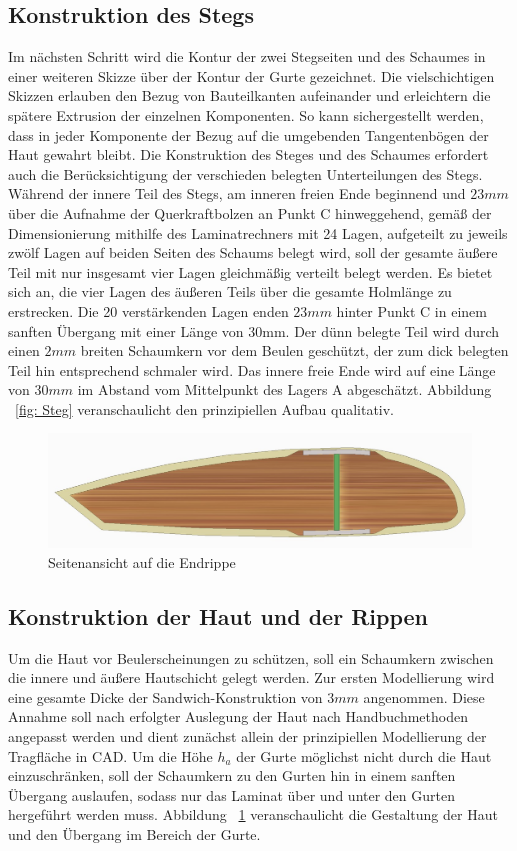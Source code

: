 \subsection{Konstruktion des Stegs}
\noindent Im nächsten Schritt wird die Kontur der zwei Stegseiten und des Schaumes in einer weiteren Skizze über der Kontur der Gurte gezeichnet. Die vielschichtigen Skizzen erlauben den Bezug von Bauteilkanten aufeinander und erleichtern die spätere Extrusion der einzelnen Komponenten. So kann sichergestellt werden, dass in jeder Komponente der Bezug auf die umgebenden Tangentenbögen der Haut gewahrt bleibt. Die Konstruktion des Steges und des Schaumes erfordert auch die Berücksichtigung der verschieden belegten Unterteilungen des Stegs. Während der innere Teil des Stegs, am inneren freien Ende beginnend und $ 23mm $ über die Aufnahme der Querkraftbolzen an Punkt C hinweggehend, gemäß der Dimensionierung mithilfe des Laminatrechners mit 24 Lagen, aufgeteilt zu jeweils zwölf Lagen auf beiden Seiten des Schaums belegt wird, soll der gesamte äußere Teil mit nur insgesamt vier Lagen gleichmäßig verteilt belegt werden. Es bietet sich an, die vier Lagen des äußeren Teils über die gesamte Holmlänge zu erstrecken. Die 20 verstärkenden Lagen enden $ 23mm $ hinter Punkt C in einem sanften Übergang mit einer Länge von 30mm. Der dünn belegte Teil wird durch einen $ 2mm $ breiten Schaumkern vor dem Beulen geschützt, der zum dick belegten Teil hin entsprechend schmaler wird. Das innere freie Ende wird auf eine Länge von $ 30mm $ im Abstand vom Mittelpunkt des Lagers A abgeschätzt. Abbildung ~\ref{fig: Steg} veranschaulicht den prinzipiellen Aufbau qualitativ.

\begin{figure}
	\includegraphics[width=1.0\textwidth]{Bilder/Seite.jpg}
	\caption{Seitenansicht auf die Endrippe}
	\label{fig: Seite}
\end{figure}

\subsection{Konstruktion der Haut und der Rippen}
Um die Haut vor Beulerscheinungen zu schützen, soll ein Schaumkern zwischen die innere und äußere Hautschicht gelegt werden. Zur ersten Modellierung wird eine gesamte Dicke der Sandwich-Konstruktion von $ 3mm $ angenommen. Diese Annahme soll nach erfolgter Auslegung der Haut nach Handbuchmethoden angepasst werden und dient zunächst allein der prinzipiellen Modellierung der Tragfläche in CAD. Um die Höhe $ h_{a} $ der Gurte möglichst nicht durch die Haut einzuschränken, soll der Schaumkern zu den Gurten hin in einem sanften Übergang auslaufen, sodass nur das Laminat über und unter den Gurten hergeführt werden muss. Abbildung ~\ref{fig: Seite} veranschaulicht die Gestaltung der Haut und den Übergang im Bereich der Gurte.\\

